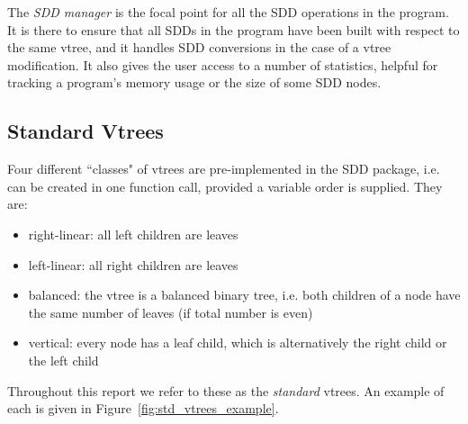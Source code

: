 \documentclass[11pt]{report}
\begin{document}
The \textit{SDD manager} is the focal point for all the SDD operations in the program. It is there to ensure that all SDDs in the program have been built with respect to the same vtree, and it handles SDD conversions in the case of a vtree modification. It also gives the user access to a number of statistics, helpful for tracking a program's memory usage or the size of some SDD nodes. 

\subsection{Standard Vtrees}
\label{std_vtrees}

Four different ``classes" of vtrees are pre-implemented in the SDD package, i.e. can be created in one function call, provided a variable order is supplied. 
They are:
\begin{itemize}
\item right-linear: all left children are leaves
\item left-linear: all right children are leaves
\item balanced: the vtree is a balanced binary tree, i.e. both children of a node have the same number of leaves (if total number is even)
\item vertical: every node has a leaf child, which is alternatively the right child or the left child
\end{itemize}
Throughout this report we refer to these as the \textit{standard} vtrees. An example of each is given in Figure~\ref{fig:std_vtrees_example}.
\end{document}
